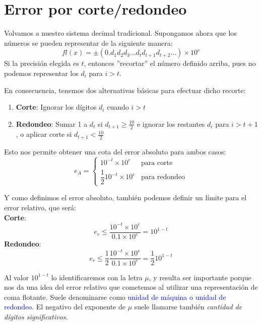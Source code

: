 \section{Error por corte/redondeo}
\begin{frame}
Volvamos a nuestro sistema decimal tradicional. Supongamos ahora que los números se pueden representar de la siguiente manera:
\[ fl(x) = \pm (0 . d_{1} d_{2} d_{3} \ldots d_{t} d_{t+1} d_{t+2} \ldots) \times 10^{e} \]
Si la precisión elegida es $t$, entonces ''recortar'' el número definido arriba, pues no podemos representar los $d_{i}$ para $i > t$.
\end{frame}
\begin{frame}[fragile]
En consecuencia, tenemos dos alternativas básicas para efectuar dicho recorte:
\begin{enumerate}[<+->]
\item  \textbf{Corte}: Ignorar los dígitos $d_{i}$ cuando $i > t$
\item \textbf{Redondeo}: Sumar 1 a $d_{t}$ si $d_{t+1}\geq \frac{10}{2}$ e ignorar los restantes $d_{i}$ para $i > t + 1$, o aplicar corte si $d_{t+1} < \frac{10}{2}$
\end{enumerate}
\end{frame}
\begin{frame}
Esto nos permite obtener una cota del error absoluto para ambos casos:
\[ e_{A} = \left\{ \begin{array}{ll}
10^{-t} \times 10^{e} & \mbox{para corte} \\
\dfrac{1}{2} 10^{-t} \times 10^{e} & \mbox{para redondeo}
\end{array} \right. \]
\end{frame}
\begin{frame}
Y como definimos el error absoluto, también podemos definir un límite para el error relativo, que será:
\\
\medskip
\textbf{Corte}:
\[ e_{r} \leq \dfrac{10^{-t} \times 10^{e}}{0.1 \times 10^{e}} = 10^{1-t} \]
\textbf{Redondeo}:
\[e_{r} \leq \dfrac{1}{2}\dfrac{10^{-t} \times 10^{e}}{0.1 \times 10^{e}} = \dfrac{1}{2}10^{1-t}\]
\end{frame}
\begin{frame}
Al valor $10^{1-t}$ lo identificaremos con la letra $\mu$, y resulta ser importante porque nos da
una idea del error relativo que cometemos al utilizar una representación de coma flotante. Suele
denominarse como \textcolor{blue}{unidad de máquina o unidad de redondeo}. El negativo del exponente de $\mu$ suele llamarse también \textit{cantidad de dígitos significativos}.
\end{frame}
